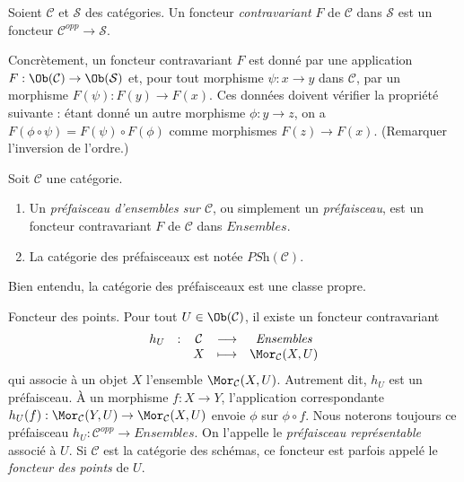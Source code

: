\begin{definition}
\label{definition-contravariant}
Soient $\mathcal{C}$ et $\mathcal{S}$ des catégories.
Un foncteur {\it contravariant} $F$
de $\mathcal{C}$ dans $\mathcal{S}$
est un foncteur $\mathcal{C}^{opp}\to \mathcal{S}$.
\end{definition}

\noindent
Concrètement, un foncteur contravariant $F$ est donné
par une application $F : \Ob(\mathcal{C}) \to
\Ob(\mathcal{S})$ et, pour tout morphisme
$\psi : x \to y$ dans $\mathcal{C}$, par un morphisme
$F(\psi) : F(y) \to F(x)$. Ces données doivent vérifier la propriété
suivante : étant donné un autre morphisme
$\phi : y \to z$, on a $F(\phi \circ \psi)
= F(\psi) \circ F(\phi)$ comme morphismes $F(z) \to F(x)$.
(Remarquer l'inversion de l'ordre.)

\begin{definition}
\label{definition-presheaf}
Soit $\mathcal{C}$ une catégorie.
\begin{enumerate}
\item Un {\it préfaisceau d'ensembles sur $\mathcal{C}$},
ou simplement un {\it préfaisceau}, est un foncteur contravariant
$F$ de $\mathcal{C}$ dans $\textit{Ensembles}$.
\item La catégorie des préfaisceaux est notée $\textit{PSh}(\mathcal{C})$.
\end{enumerate}
\end{definition}

\noindent
Bien entendu, la catégorie des préfaisceaux est une classe propre.

\begin{example}
\label{example-hom-functor}
Foncteur des points.
Pour tout $U\in \Ob(\mathcal{C})$, il existe un foncteur contravariant
$$
\begin{matrix}
h_U & : & \mathcal{C}
&
\longrightarrow
&
\textit{Ensembles} \\
& &
X
&
\longmapsto
&
\Mor_\mathcal{C}(X, U)
\end{matrix}
$$
qui associe à un objet $X$ l'ensemble
$\Mor_\mathcal{C}(X, U)$. Autrement dit, $h_U$ est un préfaisceau.
À un morphisme $f : X\to Y$, l'application correspondante
$h_U(f) : \Mor_\mathcal{C}(Y, U)\to \Mor_\mathcal{C}(X, U)$
envoie $\phi$ sur $\phi\circ f$. Nous noterons toujours ce préfaisceau
$h_U : \mathcal{C}^{opp} \to \textit{Ensembles}$.
On l'appelle le {\it préfaisceau représentable} associé à $U$.
Si $\mathcal{C}$ est la catégorie des schémas, ce foncteur est
parfois appelé le \emph{foncteur des points} de $U$.
\end{example}

